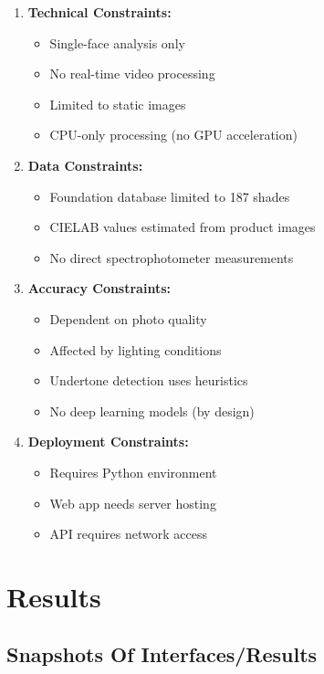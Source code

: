 \begin{enumerate}
    \item \textbf{Technical Constraints:}
    \begin{itemize}
        \item Single-face analysis only
        \item No real-time video processing
        \item Limited to static images
        \item CPU-only processing (no GPU acceleration)
    \end{itemize}
    
    \item \textbf{Data Constraints:}
    \begin{itemize}
        \item Foundation database limited to 187 shades
        \item CIELAB values estimated from product images
        \item No direct spectrophotometer measurements
    \end{itemize}
    
    \item \textbf{Accuracy Constraints:}
    \begin{itemize}
        \item Dependent on photo quality
        \item Affected by lighting conditions
        \item Undertone detection uses heuristics
        \item No deep learning models (by design)
    \end{itemize}
    
    \item \textbf{Deployment Constraints:}
    \begin{itemize}
        \item Requires Python environment
        \item Web app needs server hosting
        \item API requires network access
    \end{itemize}
\end{enumerate}

\section{Results}

\subsection{Snapshots Of Interfaces/Results}

